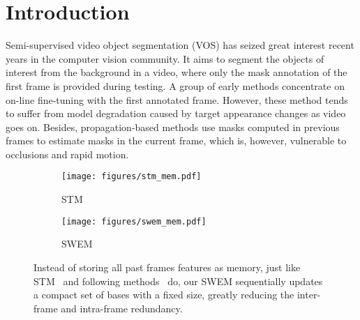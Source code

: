\let\thefootnote\relax{}
\let\thefootnote\relax{} 

\section{Introduction}
Semi-supervised video object segmentation (VOS) has seized great interest recent years\cite{caelles2017one,perazzi2017learning,Johnander_2019_CVPR,Voigtlaender_2019_CVPR,Li_2019_ICCV,Oh_2019_ICCV,Wang_2019_ICCV,seong_2020_ECCV,lu_2020_ECCV,liang2020video,hu2021learning,xie2021efficient,wang2021swiftnet,duke2021sstvos,yang2021associating, seong2021hierarchical,cheng2021stcn} in the computer vision community.
It aims to segment the objects of interest from the background in a video, where only the mask annotation of the first frame is provided during testing.  A group of early methods concentrate on on-line fine-tuning\cite{caelles2017one,bao2018cnn,maninis2018video,luiten2018premvos,khoreva2017lucid} with the first annotated frame. However, these method tends to suffer from model degradation caused by target appearance changes as video goes on. Besides, propagation-based methods use masks computed in previous frames to estimate masks in the current frame\cite{perazzi2017learning,cheng2018fast,wug2018fast,wang2018semi}, which is, however, vulnerable to occlusions and rapid motion.

\begin{figure}
\centering
  \begin{subfigure}{0.48\linewidth}
  \centering
      \texttt{[image: figures/stm\_mem.pdf]}
    \caption{STM}\label{subfig:stm_mem}
  \end{subfigure}
  \hfill
  \begin{subfigure}{0.48\linewidth}
  \centering
      \texttt{[image: figures/swem\_mem.pdf]}
    \caption{SWEM}\label{fig:subfig:swem_mem}
  \end{subfigure}
\vspace{-0.3 cm}
\caption{Instead of storing all past frames features as memory, just like STM~\cite{Oh_2019_ICCV} and following methods~\cite{seong_2020_ECCV,hu2021learning,seong2021hierarchical,cheng2021stcn} do, our SWEM sequentially updates a compact set of bases with a fixed size, greatly reducing the inter-frame and intra-frame redundancy.}
\vspace{-0.5 cm}
\label{fig:stm_swem_mem} %
\end{figure}


